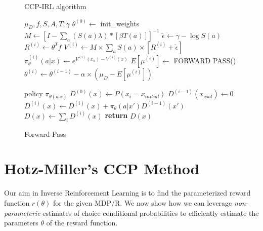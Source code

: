 \documentclass{article}
\begin{document}
\begin{figure}[ht]
\begin{minipage}[t]{0.45\textwidth}
  \begin{algorithm}[H]
    \caption{CCP-IRL algorithm} \label{algo:ccp_irl_algorithm}
    \begin{algorithmic}[1]
         $\mu_D,f, S, A, T, \gamma$
        \STATE $\theta^{(0)} \gets$ init\_weights
        \STATE $M \gets \left[I-\sum_{a}(S(a) \lambda) *\left[ \beta T(a)  \right]\right]^{-1}$ 
        \STATE $\tilde{\epsilon} \gets \gamma - \log S(a)$
            \STATE $R^{(i)} \gets \theta^T f$
            \STATE $V^{(i)} \gets M \times \sum_{a}{S(a) \times \left[ R^{(i)} +\tilde{\epsilon}\right]}$
            \STATE $\pi_{\theta}^{(i)}(a|x) \gets e^{V^{(i)}(x_a) - V^{(i)}(x)}$
            \STATE $E[\mu^{(i)}] \gets $ FORWARD PASS()
            \STATE $\theta^{(i)} \gets \theta^{(i-1)} - \alpha \times (\mu_D - E[\mu^{(i)}])$
        \ENDFOR
    \end{algorithmic}
  \end{algorithm}
\end{minipage}%
\qquad
\begin{minipage}[t]{0.45\textwidth}
  \begin{algorithm}[H]
    \caption{Forward Pass} \label{algo:forward_pass_algorithm}
    \begin{algorithmic}[1]
         policy $\pi_{\theta(a|x)}$
        \STATE $D^{(0)}(x) \gets P(x_i = x_{initial})$
            \STATE $D^{(i-1)}(x_{goal}) \gets 0$
            \STATE $D^{(i)}(x) \gets D^{(i)}(x) + \pi_{\theta}(a|x') D^{(i-1)}(x')$
        \ENDFOR
        \STATE $D(x) \gets \sum_{i}D^{(i)}(x)$ 
        \STATE \textbf{return} $D(x)$
    \end{algorithmic}
  \end{algorithm}
\end{minipage}
\end{figure}


\section{Hotz-Miller's CCP Method}

Our aim in Inverse Reinforcement Learning is to find the parameterized reward function $r(\theta)$ for the given MDP/R. We now show how we can leverage \textit{non-parameteric} estimates of choice conditional probabilities to efficiently estimate the parameters $\theta$ of the reward function. 
\end{document}
